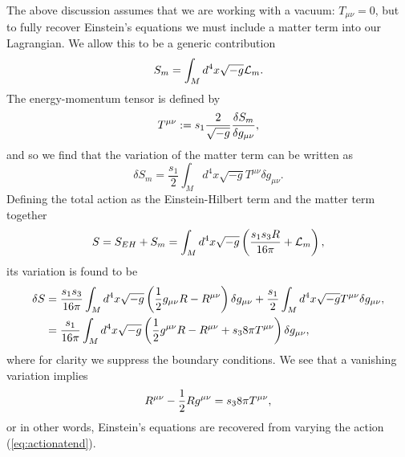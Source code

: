 The above discussion assumes that we are working with a vacuum: $T_{\mu \nu} = 0$, but to fully recover Einstein's equations we must include a matter term into our Lagrangian. We allow this to be a generic contribution
\begin{equation*}
	S_m = \int_M d^4x \sqrt{-g} {\cal L}_m.
\end{equation*}
The energy-momentum tensor is defined by
\begin{equation*}
	T^{\mu \nu} := s_1 \frac{2}{\sqrt{-g}} \frac{\delta S_m}{\delta g_{\mu \nu}},
\end{equation*}
and so we find that the variation of the matter term can be written as
\begin{equation*}
	\delta S_m = \frac{s_1}{2} \int_M d^4x \sqrt{-g} T^{\mu \nu} \delta g_{\mu \nu} .
\end{equation*}
Defining the total action as the Einstein-Hilbert term and the matter term together
\begin{equation}
\label{eq:actionatend}
	S = S_{EH} + S_m = \int_M d^4x \sqrt{-g} \left(\frac{s_1 s_3 R}{16\pi} + {\cal L}_m \right),
\end{equation}
its variation is found to be
\begin{equation*}
\begin{aligned}
		\delta S &= \frac{s_1 s_3}{16 \pi} \int_M d^4x \sqrt{-g} \left(\frac{1}{2} g_{\mu \nu} R - R^{\mu \nu} \right) \delta g_{\mu \nu}  + \frac{s_1}{2} \int_M d^4x\sqrt{-g} T^{\mu \nu} \delta g_{\mu \nu} , \\
		&= \frac{s_1}{16 \pi} \int_M d^4x \sqrt{-g} \left(\frac{1}{2} g^{\mu \nu} R - R^{\mu \nu} + s_3 8\pi T^{\mu \nu} \right) \delta g_{\mu \nu} ,
\end{aligned}
\end{equation*}
where for clarity we suppress the boundary conditions. We see that a vanishing variation implies
\begin{equation*}
	R^{\mu \nu} - \frac{1}{2} R g^{\mu \nu} = s_3 8\pi T^{\mu \nu},
\end{equation*}
or in other words, Einstein's equations are recovered from varying the action (\ref{eq:actionatend}).
